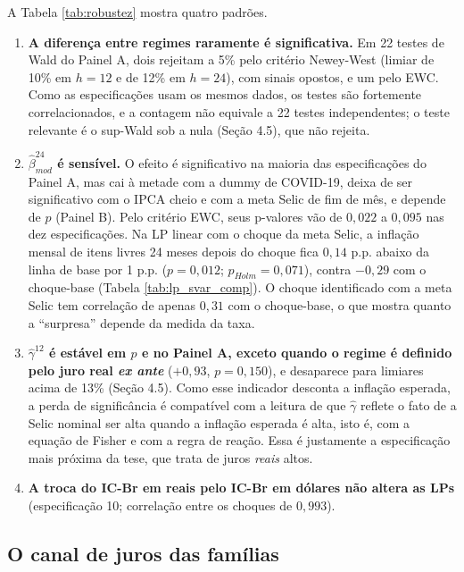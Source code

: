 \documentclass[12pt,a4paper]{article}
\begin{document}
A Tabela \ref{tab:robustez} mostra quatro padrões.
\begin{enumerate}
    \item \textbf{A diferença entre regimes raramente é significativa.} Em 22 testes de Wald do Painel A, dois rejeitam a 5\% pelo critério Newey-West (limiar de 10\% em $h = 12$ e de 12\% em $h = 24$), com sinais opostos, e um pelo EWC. Como as especificações usam os mesmos dados, os testes são fortemente correlacionados, e a contagem não equivale a 22 testes independentes; o teste relevante é o sup-Wald sob a nula (Seção 4.5), que não rejeita.
    \item \textbf{$\hat{\beta}_{mod}^{24}$ é sensível.} O efeito é significativo na maioria das especificações do Painel A, mas cai à metade com a dummy de COVID-19, deixa de ser significativo com o IPCA cheio e com a meta Selic de fim de mês, e depende de $p$ (Painel B). Pelo critério EWC, seus p-valores vão de $0{,}022$ a $0{,}095$ nas dez especificações. Na LP linear com o choque da meta Selic, a inflação mensal de itens livres 24 meses depois do choque fica $0{,}14$ p.p. abaixo da linha de base por 1 p.p. ($p = 0{,}012$; $p_{Holm} = 0{,}071$), contra $-0{,}29$ com o choque-base (Tabela \ref{tab:lp_svar_comp}). O choque identificado com a meta Selic tem correlação de apenas $0{,}31$ com o choque-base, o que mostra quanto a ``surpresa'' depende da medida da taxa.
    \item \textbf{$\hat{\gamma}^{12}$ é estável em $p$ e no Painel A, exceto quando o regime é definido pelo juro real \textit{ex ante}} ($+0{,}93$, $p = 0{,}150$), e desaparece para limiares acima de 13\% (Seção 4.5). Como esse indicador desconta a inflação esperada, a perda de significância é compatível com a leitura de que $\hat{\gamma}$ reflete o fato de a Selic nominal ser alta quando a inflação esperada é alta, isto é, com a equação de Fisher e com a regra de reação. Essa é justamente a especificação mais próxima da tese, que trata de juros \emph{reais} altos.
    \item \textbf{A troca do IC-Br em reais pelo IC-Br em dólares não altera as LPs} (especificação 10; correlação entre os choques de $0{,}993$).
\end{enumerate}

\subsection{O canal de juros das famílias}
\end{document}
